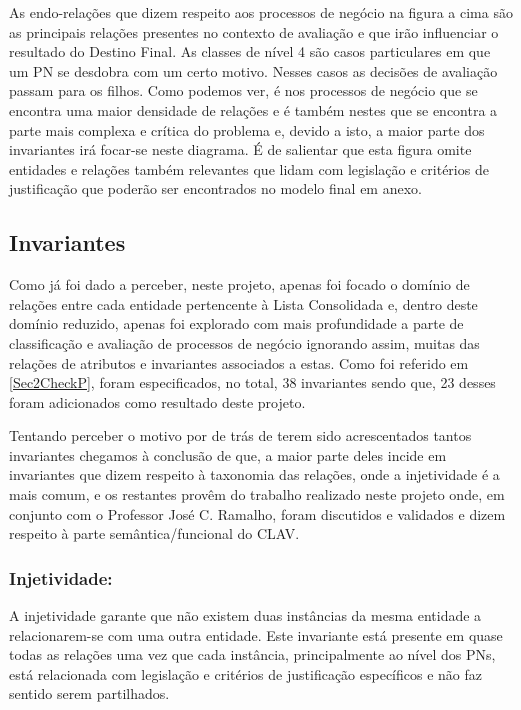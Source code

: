 \documentclass[tikz,runningheads,a4paper]{llncs}
\begin{document}
As endo-relações que dizem respeito aos processos de negócio na figura a cima são as principais relações presentes no contexto de avaliação e que irão influenciar o resultado do Destino Final. As classes de nível 4 são casos particulares em que um PN se desdobra com um certo motivo. Nesses casos as decisões de avaliação passam para os filhos. Como podemos ver, é nos processos de negócio que se encontra uma maior densidade de relações e é também nestes que se encontra a parte mais complexa e crítica do problema e, devido a isto, a maior parte dos invariantes irá focar-se neste diagrama. É de salientar que esta figura omite entidades e relações também relevantes que lidam com legislação e critérios de justificação que poderão ser encontrados no modelo final em anexo.

\subsection{Invariantes} \label{SubSecInv}

Como já foi dado a perceber, neste projeto, apenas foi focado o domínio de relações entre cada entidade pertencente à Lista Consolidada e, dentro deste domínio reduzido, apenas foi explorado com mais profundidade a parte de classificação e avaliação de processos de negócio ignorando assim, muitas das relações de atributos e invariantes associados a estas. Como foi referido em \ref{Sec2CheckP}, foram especificados, no total, 38 invariantes sendo que, 23 desses foram adicionados como resultado deste projeto.

Tentando perceber o motivo por de trás de terem sido acrescentados tantos invariantes chegamos à conclusão de que, a maior parte deles incide em invariantes que dizem respeito à taxonomia das relações, onde a injetividade é a mais comum, e os restantes provêm do trabalho realizado neste projeto onde, em conjunto com o Professor José C. Ramalho, foram discutidos e validados e dizem respeito à parte semântica/funcional do CLAV.

\subsubsection{Injetividade:}

A injetividade garante que não existem duas instâncias da mesma entidade a relacionarem-se com uma outra entidade. Este invariante está presente em quase todas as relações uma vez que cada instância, principalmente ao nível dos PNs, está relacionada com legislação e critérios de justificação específicos e não faz sentido serem partilhados.
\end{document}
